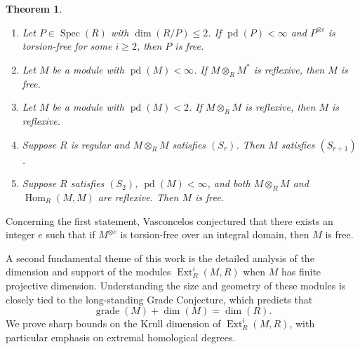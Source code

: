 \documentclass[11.05pt,a4paper]{amsart}
\newtheorem{theorem}{Theorem}[section]
\theoremstyle{definition}
\theoremstyle{remark}
\newcommand{\Spec}{\operatorname{Spec}}
\newcommand{\pd}{\operatorname{pd}}
\newcommand{\Ext}{\operatorname{Ext}}
\newcommand{\Hom}{\operatorname{Hom}}
\begin{document}
\begin{theorem}\label{1.1}
	\begin{enumerate}
		\item
		Let \( P \in \Spec(R) \) with \( \dim (R/P) \leq 2 \). If \( \pd(P) < \infty \) and \( P^{\otimes i} \) is torsion-free for some \( i \ge 2 \), then \( P \) is free.
		
		\item
		Let \( M \) be a module with \( \pd(M) < \infty \). If \( M \otimes_R M^* \) is reflexive, then \( M \) is free.
		
		\item
		Let \( M \) be a module with \( \pd(M) < 2 \). If \( M \otimes_R M \) is reflexive, then \( M \) is reflexive.
		
		\item
		Suppose \( R \) is regular and \( M \otimes_R M \) satisfies \( (S_r) \). Then \( M \) satisfies \( (S_{r+1}) \).
		
		\item
		Suppose \( R \) satisfies \( (S_2) \), \( \pd(M) < \infty \), and both \( M \otimes_R M \) and \( \Hom_R(M,M) \) are reflexive. Then \( M \) is free.
	\end{enumerate}
\end{theorem}

Concerning the first statement, Vasconcelos \cite{2010} conjectured that there exists an integer \( e \) such that if \( M^{\otimes e} \) is torsion-free over an integral domain, then \( M \) is free.

A second fundamental theme of this work is the detailed analysis of the dimension and support of the modules \( \Ext^i_R(M,R) \) when \( M \) has finite projective dimension. Understanding the size and geometry of these modules is closely tied to the long-standing Grade Conjecture, which predicts that
\[
\operatorname{grade}(M) + \dim(M) = \dim(R).
\]
We prove sharp bounds on the Krull dimension of \( \Ext^i_R(M,R) \), with particular emphasis on extremal homological degrees.
\end{document}
